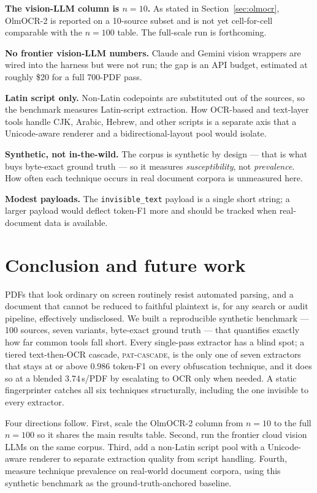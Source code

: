 \documentclass[11pt]{article}
\newcommand{\variant}[1]{\texttt{#1}}
\begin{document}
\textbf{The vision-LLM column is $n=10$.} As stated in
Section~\ref{sec:olmocr}, OlmOCR-2 is reported on a 10-source subset and
is not yet cell-for-cell comparable with the $n=100$ table. The
full-scale run is forthcoming.

\textbf{No frontier vision-LLM numbers.} Claude and Gemini vision
wrappers are wired into the harness but were not run; the gap is an API
budget, estimated at roughly \$20 for a full 700-PDF pass.

\textbf{Latin script only.} Non-Latin codepoints are substituted out of
the sources, so the benchmark measures Latin-script extraction. How
OCR-based and text-layer tools handle CJK, Arabic, Hebrew, and other
scripts is a separate axis that a Unicode-aware renderer and a
bidirectional-layout pool would isolate.

\textbf{Synthetic, not in-the-wild.} The corpus is synthetic by design
--- that is what buys byte-exact ground truth --- so it measures
\emph{susceptibility}, not \emph{prevalence}. How often each technique
occurs in real document corpora is unmeasured here.

\textbf{Modest payloads.} The \variant{invisible\_text} payload is a
single short string; a larger payload would deflect token-F1 more and
should be tracked when real-document data is available.

\section{Conclusion and future work}
\label{sec:conclusion}

PDFs that look ordinary on screen routinely resist automated parsing,
and a document that cannot be reduced to faithful plaintext is, for any
search or audit pipeline, effectively undisclosed. We built a
reproducible synthetic benchmark --- 100 sources, seven variants,
byte-exact ground truth --- that quantifies exactly how far common tools
fall short. Every single-pass extractor has a blind spot; a tiered
text-then-OCR cascade, \textsc{pat-cascade}, is the only one of seven
extractors that stays at or above $0.986$ token-F1 on every obfuscation
technique, and it does so at a blended 3.74\,s/PDF by escalating to OCR
only when needed. A static fingerprinter catches all six techniques
structurally, including the one invisible to every extractor.

Four directions follow. First, scale the OlmOCR-2 column from $n=10$ to
the full $n=100$ so it shares the main results table. Second, run the
frontier cloud vision LLMs on the same corpus. Third, add a non-Latin
script pool with a Unicode-aware renderer to separate extraction quality
from script handling. Fourth, measure technique prevalence on real-world
document corpora, using this synthetic benchmark as the
ground-truth-anchored baseline.
\end{document}
